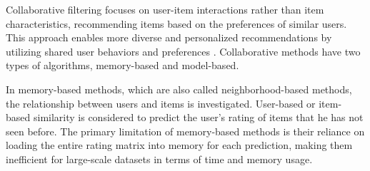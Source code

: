 \documentclass{article}
\begin{document}
Collaborative filtering focuses on user-item interactions rather than item characteristics, recommending items based on the preferences of similar users. This approach enables more diverse and personalized recommendations by utilizing shared user behaviors and preferences \cite{isinkaye2023matrix}. Collaborative methods have two types of algorithms, memory-based and model-based.

In memory-based methods, which are also called neighborhood-based methods, the relationship between users and items is investigated. User-based \cite{zhao2010user,valcarce2019collaborative} or item-based \cite{sarwar2001item,fu2018attention} similarity is considered to predict the user's rating of items that he has not seen before. The primary limitation of memory-based methods is their reliance on loading the entire rating matrix into memory for each prediction, making them inefficient for large-scale datasets in terms of time and memory usage. 
\end{document}
